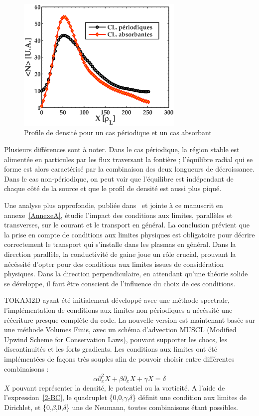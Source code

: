 \begin{refsection}
\begin{figure}[htbp]
\centering
    \includegraphics[width=8cm]{figures/2-profileDenNoLimit.eps}
    \caption{Profile de densité pour un cas périodique et un cas
    absorbant\label{2-profileDenNoLimit}}
\end{figure}
	Plusieurs différences sont à noter. Dans le cas périodique, la région stable
	est alimentée en particules par les flux traversant la fontière ; l'équilibre radial qui se
	forme est alors caractérisé par la combinaison des deux longueurs de
	décroissance.
	Dans le cas non-périodique, on peut voir que l'équilibre est indépendant de
	chaque côté de la source et que le profil de densité est aussi plus piqué. 
	
	Une analyse plus approfondie, publiée dans~\parencite{Futtersack-PSI} et
	jointe à ce manuscrit en annexe~\ref{AnnexeA}, étudie l'impact des conditions
	aux limites, parallèles et transverses, sur le courant et le transport en général.
	La conclusion prévient que la prise en compte de conditions aux limites
	physiques est obligatoire pour décrire correctement le transport qui s'installe
	dans les plasmas en général. Dans la direction parallèle, la conductivité de
	gaine joue un rôle crucial, prouvant la nécéssité d'opter pour des conditions
	aux limites issues de considération physiques. Dans la direction
	perpendiculaire, en attendant qu'une théorie solide se développe, il faut être
	conscient de l'influence du choix de ces conditions.
	
	TOKAM2D ayant été initialement
	développé avec une méthode spectrale, l'implémentation de conditions aux
	limites non-périodiques a nécéssité une réécriture presque complète du code.
	La nouvelle version est maintenant basée sur une méthode Volumes Finis, avec un
	schéma d'advection MUSCL (Modified Upwind Scheme for Conservation Laws),
	pouvant supporter les chocs, les discontinuités et les forts gradients. Les
	conditions aux limites ont été implémentées de façons très souples afin de
	pouvoir choisir entre différentes combinaisons :
	\begin{equation}
	\label{2-BC}
		\alpha \partial^2_{x}X + \beta \partial_{x}X + \gamma X =
		\delta
	\end{equation}
	$X$ pouvant représenter la densité, le potentiel ou la vorticité. A l'aide de
	l'expression~\ref{2-BC}, le quadruplet \{0,0,$\gamma$,$\delta$\} définit une
	condition aux limites de Dirichlet, et \{0,$\beta$,0,$\delta$\} une de
	Neumann, toutes combinaisons étant possibles.
	

\end{refsection}
